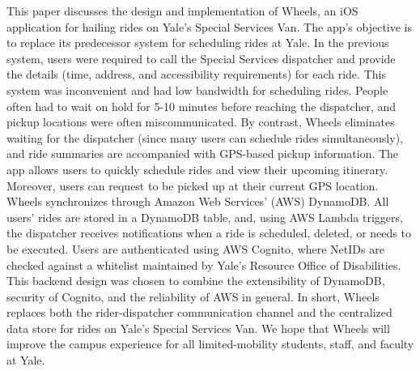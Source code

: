 \documentclass[12pt, a4paper]{article}
\author{\theauthor}
\title{\thetitle}
\date{\duedate}
\renewenvironment{abstract}
 {\small
  \begin{center}
  \bfseries \abstractname\vspace{-.5em}\vspace{0pt}
  \end{center}
  \list{}{%
    \setlength{\leftmargin}{0mm}%
    \setlength{\rightmargin}{\leftmargin}%
  }%
  \item\relax}
 {\endlist}
\begin{document}
\maketitle
\thispagestyle{empty}
\begin{abstract}
    This paper discusses the design and implementation of Wheels, an iOS application for hailing rides on Yale's Special Services Van. The app's objective is to replace its predecessor system for scheduling rides at Yale. In the previous system, users were required to call the Special Services dispatcher and provide the details (time, address, and accessibility requirements) for each ride. This system was inconvenient and had low bandwidth for scheduling rides. People often had to wait on hold for 5-10 minutes before reaching the dispatcher, and pickup locations were often miscommunicated. By contrast, Wheels eliminates waiting for the dispatcher (since many users can schedule rides simultaneously), and ride summaries are accompanied with GPS-based pickup information. The app allows users to quickly schedule rides and view their upcoming itinerary. Moreover, users can request to be picked up at their current GPS location. Wheels synchronizes through Amazon Web Services' (AWS) DynamoDB. All users' rides are stored in a DynamoDB table, and, using AWS Lambda triggers, the dispatcher receives notifications when a ride is scheduled, deleted, or needs to be executed. Users are authenticated using AWS Cognito, where NetIDs are checked against a whitelist maintained by Yale's Resource Office of Disabilities. This backend design was chosen to combine the extensibility of DynamoDB, security of Cognito, and the reliability of AWS in general. In short, Wheels replaces both the rider-dispatcher communication channel and the centralized data store for rides on Yale's Special Services Van. We hope that Wheels will improve the campus experience for all limited-mobility students, staff, and faculty at Yale.
\end{abstract}
\end{document}
